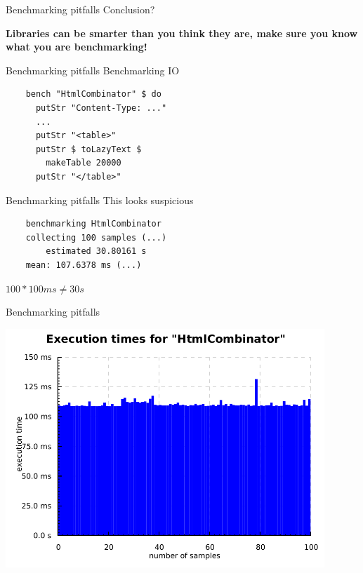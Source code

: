 \documentclass[20pt]{beamer}
\newcommand{\vspaced}{
    \vspace{5mm}
}
\begin{document}
\begin{frame}{Benchmarking pitfalls}
    Conclusion? \\
    \vspaced
    \textbf{Libraries can be smarter than you think they are, make sure you know
    what you are benchmarking!}
\end{frame}

\begin{frame}[fragile]{Benchmarking pitfalls}
    Benchmarking IO \\
    \vspaced
    \begin{lstlisting}
    bench "HtmlCombinator" $ do
      putStr "Content-Type: ..."
      ...
      putStr "<table>"
      putStr $ toLazyText $
        makeTable 20000
      putStr "</table>"
    \end{lstlisting}
\end{frame}

\begin{frame}[fragile]{Benchmarking pitfalls}
    This looks suspicious \\
    \vspaced
    \begin{lstlisting}
    benchmarking HtmlCombinator
    collecting 100 samples (...)
        estimated 30.80161 s
    mean: 107.6378 ms (...)
    \end{lstlisting}
    \vspaced
    $100 * 100ms \neq 30s$
\end{frame}

\begin{frame}{Benchmarking pitfalls}
    \begin{center}
    \includegraphics[width=0.9\textwidth]{images/htmlcombinator.pdf}
    \end{center}
\end{frame}
\end{document}
